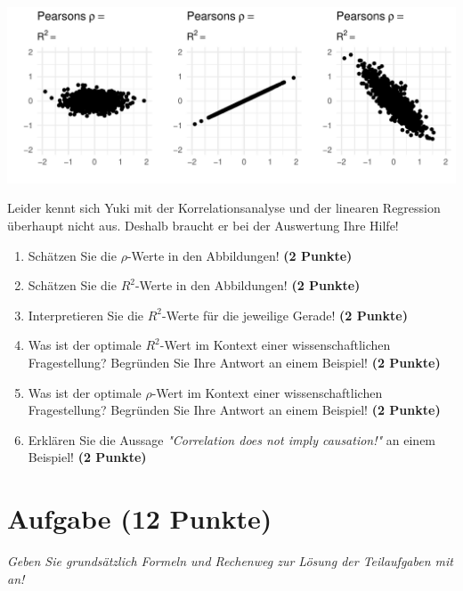 \documentclass[a4paper, 9pt]{scrartcl}\usepackage[]{graphicx}\usepackage[]{xcolor}
\makeatletter
\def\maxwidth{ %
  \ifdim\Gin@nat@width>\linewidth
    \linewidth
  \else
    \Gin@nat@width
  \fi
}
\makeatother
\begin{document}
{\centering \includegraphics[width=\maxwidth]{img/correlation-02-1} 

}




Leider kennt sich Yuki mit der Korrelationsanalyse und der linearen Regression überhaupt nicht aus. Deshalb braucht er bei der Auswertung Ihre Hilfe!

\begin{enumerate}
\item Schätzen Sie die $\rho$-Werte in den Abbildungen! \textbf{(2 Punkte)}
\item Schätzen Sie die $R^2$-Werte in den Abbildungen! \textbf{(2 Punkte)}
\item Interpretieren Sie die $R^2$-Werte für die jeweilige Gerade! \textbf{(2 Punkte)}
\item Was ist der optimale $R^2$-Wert im Kontext einer wissenschaftlichen Fragestellung? Begründen Sie Ihre Antwort an einem Beispiel! \textbf{(2 Punkte)}
\item Was ist der optimale $\rho$-Wert im Kontext einer wissenschaftlichen Fragestellung? Begründen Sie Ihre Antwort an einem Beispiel! \textbf{(2 Punkte)}
\item Erklären Sie die Aussage \textit{"Correlation does not imply causation!"} an einem Beispiel! \textbf{(2 Punkte)}
\end{enumerate} 
\clearpage

\section{Aufgabe \hfill (12 Punkte)}

\textit{Geben Sie grundsätzlich Formeln und Rechenweg zur Lösung der Teilaufgaben mit an!} \\[1Ex]
 
\end{document}

